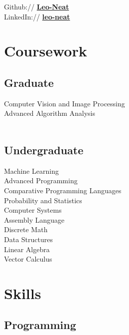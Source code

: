 \documentclass[letterpaper]{deedy-resume} %
\begin{document}
\begin{minipage}[t]{0.33\textwidth}
Github:// \href{https://github.com/Leo-Neat}{\bf Leo-Neat} \\
LinkedIn:// \href{https://www.linkedin.com/in/leo-neat-82b34b130/}{\bf leo-neat} \\

\sectionspace %
\fi

\section{Coursework}

\subsection{Graduate}

Computer Vision and Image Processing \\
Advanced Algorithm Analysis \\\
\subsection{Undergraduate}

Machine Learning \\
Advanced Programming \\
Comparative Programming Languages \\
Probability and Statistics \\
Computer Systems \\
Assembly Language \\
Discrete Math \\
Data Structures \\
Linear Algebra \\
Vector Calculus \\


\sectionspace %


\section{Skills}

\subsection{Programming}


\end{minipage}
\end{document}
